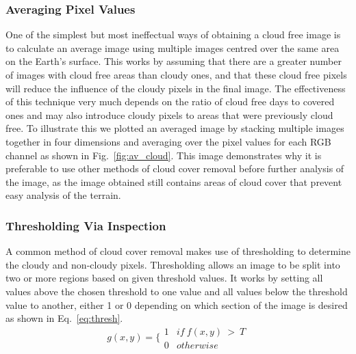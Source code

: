 \subsubsection{Averaging Pixel Values}
 One of the simplest but most ineffectual ways of obtaining a cloud free image is to calculate an average image using multiple images centred over the same area on the Earth's surface. This works by assuming that there are a greater number of images with cloud free areas than cloudy ones, and that these cloud free pixels will reduce the influence of the cloudy pixels in the final image. The effectiveness of this technique very much depends on the ratio of cloud free days to covered ones and may also introduce cloudy pixels to areas that were previously cloud free. To illustrate this we plotted an averaged image by stacking multiple images together in four dimensions and averaging over the pixel values for each RGB channel as shown in Fig.~\ref{fig:av_cloud}. This image demonstrates why it is preferable to use other methods of cloud cover removal before further analysis of the image, as the image obtained still contains areas of cloud cover that prevent easy analysis of the terrain.
\subsubsection{Thresholding Via Inspection}
 A common method of cloud cover removal makes use of thresholding to determine the cloudy and non-cloudy pixels. Thresholding allows an image to be split into two or more regions based on given threshold values. It works by setting all values above the chosen threshold to one value and all values below the threshold value to another, either 1 or 0 depending on which section of the image is desired as shown in Eq.~\ref{eq:thresh}.
 \begin{equation}\label{eq:thresh}
     g(x,y)=\Big\{\begin{matrix}
1 & if~f(x,y)~>~ T\\
0 & otherwise
\end{matrix}
 \end{equation}
 
